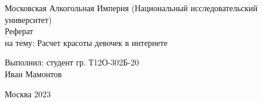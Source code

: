 \begin{center} 

\large Московская Алкогольная Империя (Национальный исследовательский университет)\\[5.5cm] 

\huge Реферат \\[0.6cm] %
\large на тему:  Расчет красоты девочек в интернете\\[3.7cm]


\end{center} 

\begin{flushright}
Выполнил: студент гр. Т12О-302Б-20 \\
Иван Мамонтов \\
\end{flushright}


\vfill 

\begin{center} 
\large Москва 2023
\end{center} 

\thispagestyle{empty}